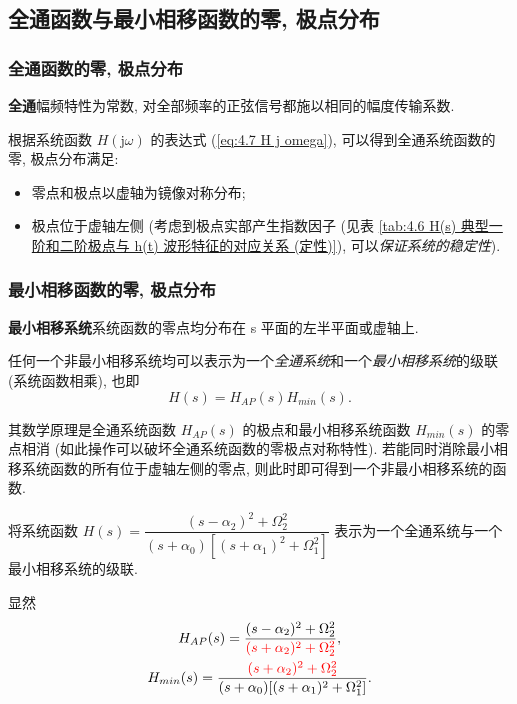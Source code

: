 \subsection{全通函数与最小相移函数的零, 极点分布} \label{4 全通函数与最小相移函数的零, 极点分布}
\subsubsection{全通函数的零, 极点分布}
\textbf{全通}\quad 幅频特性为常数, 对全部频率的正弦信号都施以相同的幅度传输系数.

根据系统函数 $H(\mathrm{j}\omega)$ 的表达式 (\ref{eq:4.7 H j omega}), 可以得到全通系统函数的零, 极点分布满足:
\begin{itemize}
    \item 零点和极点以虚轴为镜像对称分布;
    \item 极点位于虚轴左侧 (考虑到极点实部产生指数因子 (见表 \ref{tab:4.6 H(s) 典型一阶和二阶极点与 h(t) 波形特征的对应关系 (定性)}), 可以\textit{保证系统的稳定性}).
\end{itemize}

\subsubsection{最小相移函数的零, 极点分布}
\textbf{最小相移系统}\quad 系统函数的零点均分布在 s 平面的左半平面或虚轴上.

任何一个非最小相移系统均可以表示为一个\textit{全通系统}和一个\textit{最小相移系统}的级联 (系统函数相乘), 也即
\begin{equation}
    H(s)=H_{AP}(s)H_{min}(s).
\end{equation}

其数学原理是全通系统函数 $H_{AP}(s)$ 的极点和最小相移系统函数 $H_{min}(s)$ 的零点相消 (如此操作可以破坏全通系统函数的零极点对称特性). 若能同时消除最小相移系统函数的所有位于虚轴左侧的零点, 则此时即可得到一个非最小相移系统的函数.

\begin{exampleprob}
    将系统函数 $H(s)=\dfrac{(s-\alpha_2)^2+\Omega_2^2}{(s+\alpha_0)[(s+\alpha_1)^2+\Omega_1^2]}$ 表示为一个全通系统与一个最小相移系统的级联.

    \begin{solution}
        显然
        \begin{gather*}
            H_{AP}(s)=\frac{(s-\alpha_2)^2+\Omega_2^2}{\color{red} (s+\alpha_2)^2+\Omega_2^2}, \\
            H_{min}(s)=\frac{\color{red} (s+\alpha_2)^2+\Omega_2^2}{(s+\alpha_0)[(s+\alpha_1)^2+\Omega_1^2]}.
        \end{gather*}
    \end{solution}
\end{exampleprob}
